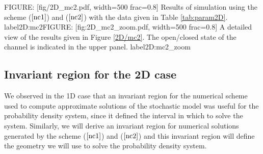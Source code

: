 FIGURE: [fig/2D_mc2.pdf, width=500 frac=0.8] Results of simulation using the scheme ($\ref{nc1}$) and ($\ref{nc2}$) with the data given in Table \ref{tab:param2D}. label{2D:mc2}FIGURE: [fig:2D_mc2_zoom.pdf, width=500 frac=0.8] A detailed view of the results given in Figure \ref{2D/mc2}. The open/closed state of the channel is indicated in the upper panel. label{2D:mc2_zoom}%


\subsection{Invariant region for the 2D case}
\label{invariant2D}

We observed in the 1D case that an invariant region for the numerical scheme used to compute approximate solutions of the stochastic model was useful for the probability density system, since it defined the interval in which to solve the system. Similarly, we will derive an invariant region for numerical solutions generated by the scheme  ($\ref{nc1}$) and ($\ref{nc2}$) and this invariant region will define the geometry we will use to solve the probability density system.

